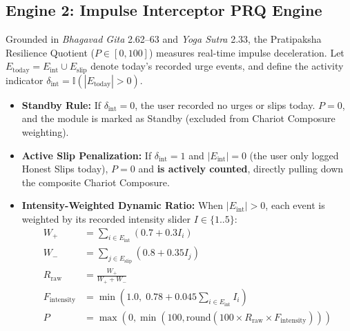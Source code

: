 \documentclass[11pt,a4paper]{article}
\begin{document}
\subsection{Engine 2: Impulse Interceptor PRQ Engine}
Grounded in \textit{Bhagavad Gita} 2.62--63 and \textit{Yoga Sutra} 2.33, the Pratipaksha Resilience Quotient ($P \in [0, 100]$) measures real-time impulse deceleration. Let $E_{\text{today}} = E_{\text{int}} \cup E_{\text{slip}}$ denote today's recorded urge events, and define the activity indicator $\delta_{\text{int}} = \mathbb{I}(|E_{\text{today}}| > 0)$.
\begin{itemize}[leftmargin=*]
    \item \textbf{Standby Rule:} If $\delta_{\text{int}} = 0$, the user recorded no urges or slips today. $P = 0$, and the module is marked as Standby (excluded from Chariot Composure weighting).
    \item \textbf{Active Slip Penalization:} If $\delta_{\text{int}} = 1$ and $|E_{\text{int}}| = 0$ (the user only logged Honest Slips today), $P = 0$ and \textbf{is actively counted}, directly pulling down the composite Chariot Composure.
    \item \textbf{Intensity-Weighted Dynamic Ratio:} When $|E_{\text{int}}| > 0$, each event is weighted by its recorded intensity slider $I \in \{1..5\}$:
    \begin{align}
        W_{+} &= \sum_{i \in E_{\text{int}}} (0.7 + 0.3 I_i) \\
        W_{-} &= \sum_{j \in E_{\text{slip}}} (0.8 + 0.35 I_j) \\
        R_{\text{raw}} &= \frac{W_{+}}{W_{+} + W_{-}} \\
        F_{\text{intensity}} &= \min\left(1.0,\; 0.78 + 0.045 \sum_{i \in E_{\text{int}}} I_i\right) \\
        P &= \max(0, \min(100, \text{round}(100 \times R_{\text{raw}} \times F_{\text{intensity}})))
    \end{align}
\end{itemize}
\end{document}
